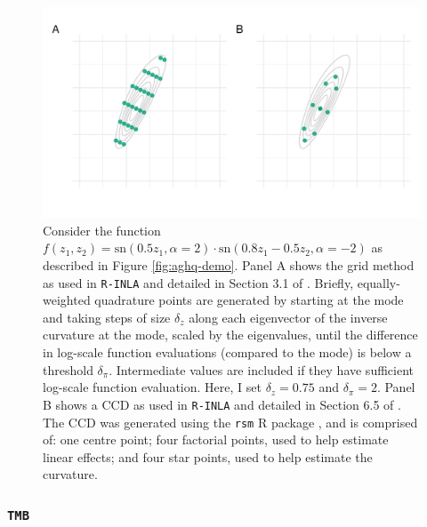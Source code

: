 \documentclass[a4paper, nobind]{templates/ociamthesis}
\begin{document}
\begin{figure}
\includegraphics[width=0.95\linewidth]{figures/naomi-aghq/inla-grid-demo} \caption{Consider the function \(f(z_1, z_2) = \text{sn}(0.5 z_1, \alpha = 2) \cdot \text{sn}(0.8 z_1 - 0.5 z_2, \alpha = -2)\) as described in Figure \ref{fig:aghq-demo}. Panel A shows the grid method as used in \texttt{R-INLA} and detailed in Section 3.1 of \textcite{rue2009approximate}. Briefly, equally-weighted quadrature points are generated by starting at the mode and taking steps of size \(\delta_z\) along each eigenvector of the inverse curvature at the mode, scaled by the eigenvalues, until the difference in log-scale function evaluations (compared to the mode) is below a threshold \(\delta_\pi\). Intermediate values are included if they have sufficient log-scale function evaluation. Here, I set \(\delta_z = 0.75\) and \(\delta_\pi = 2\). Panel B shows a CCD as used in \texttt{R-INLA} and detailed in Section 6.5 of \textcite{rue2009approximate}. The CCD was generated using the \texttt{rsm} R package \autocite{lenth2009rsm}, and is comprised of: one centre point; four factorial points, used to help estimate linear effects; and four star points, used to help estimate the curvature.}\label{fig:inla-grid-demo}
\end{figure}

\hypertarget{tmb}{%
\subsubsection{\texorpdfstring{\texttt{TMB}}{TMB}}\label{tmb}}
\end{document}
